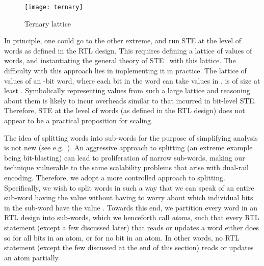 \documentclass{llncs}
\begin{document}
\begin{wrapfigure}[8]{R}{0.2\textwidth}
\begin{center}
\vspace*{-0.4in}
\texttt{[image: ternary]}
\caption{\label{ternary-lattice}Ternary lattice}
\end{center}
\end{wrapfigure}
In principle, one could go to the other extreme, and run STE at the level
of words as defined in the RTL design.  This requires defining a
lattice of values of words, and instantiating the general theory of
STE~\cite{SegerBryant95} with this lattice.  The difficulty with this
approach lies in implementing it in practice.  The lattice of values
of an -bit word, where each bit in the word can take values in
, is of size at least .  Symbolically representing
values from such a large lattice and reasoning about them is
likely to incur overheads similar to that incurred in bit-level STE.
Therefore, STE at the level of words (as defined in the RTL design)
does not appear to be a practical proposition for scaling.

The idea of splitting words into sub-words for the purpose of
simplifying analysis is not new (see e.g.~\cite{Joh01}).  An
aggressive approach to splitting (an extreme example being
bit-blasting) can lead to proliferation of narrow sub-words, making
our technique vulnerable to the same scalability problems that arise
with dual-rail encoding.  Therefore, we adopt a more controlled
approach to splitting.  Specifically, we wish to split words in such a
way that we can speak of an entire sub-word having the value 
without having to worry about which individual bits in the sub-word
have the value .  Towards this end, we partition every word in an
RTL design into sub-words, which we henceforth call \emph{atoms}, such
that every RTL statement (except a few discussed later) that reads or
updates a word either does so for all bits in an atom, or for no bit
in an atom.  In other words, no RTL statement (except the few
discussed at the end of this section) reads or updates an atom partially.  
\end{document}
